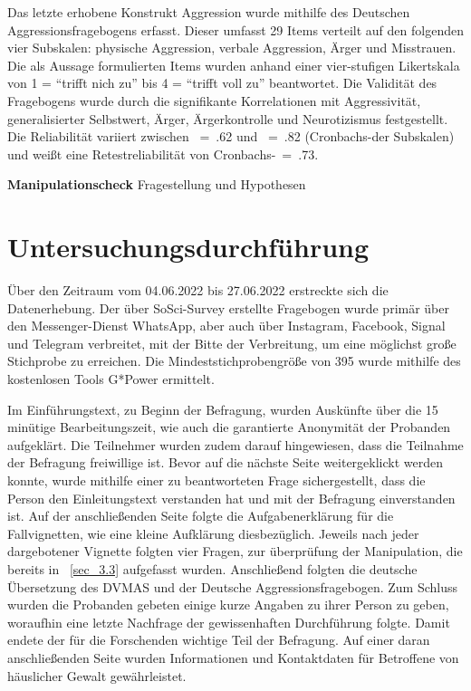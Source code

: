 Das letzte erhobene Konstrukt Aggression wurde mithilfe des Deutschen Aggressionsfragebogens erfasst. Dieser umfasst 29 Items verteilt auf den folgenden vier Subskalen: physische Aggression, verbale Aggression, Ärger und Misstrauen. Die als Aussage formulierten Items wurden anhand einer vier-stufigen Likertskala von 1 = \enquote{trifft nich zu} bis 4 = \enquote{trifft voll zu} beantwortet. Die Validität des Fragebogens wurde durch die signifikante Korrelationen mit Aggressivität, generalisierter Selbstwert, Ärger, Ärgerkontrolle und Neurotizismus festgestellt. Die Reliabilität variiert zwischen \textalpha~=~.62 und \textalpha~=~.82 (Cronbachs-\textalpha der Subskalen) und weißt eine Retestreliabilität von Cronbachs-\textalpha~=~.73\parencite{Aggressionsfragebogen}.

\textbf{Manipulationscheck}
Fragestellung und Hypothesen


\section{Untersuchungsdurchführung}   \label{sec_3.4}
Über den Zeitraum vom 04.06.2022 bis 27.06.2022 erstreckte sich die Datenerhebung. Der über SoSci-Survey erstellte Fragebogen wurde primär über den Messenger-Dienst WhatsApp, aber auch über Instagram, Facebook, Signal und Telegram verbreitet, mit der Bitte der Verbreitung, um eine möglichst große Stichprobe zu erreichen. Die Mindeststichprobengröße von 395 wurde mithilfe des kostenlosen Tools G*Power ermittelt. %

Im Einführungstext, zu Beginn der Befragung, wurden Auskünfte über die 15 minütige Bearbeitungszeit, wie auch die garantierte Anonymität der Probanden aufgeklärt. Die Teilnehmer wurden zudem darauf hingewiesen, dass die Teilnahme der Befragung freiwillige ist. Bevor auf die nächste Seite weitergeklickt werden konnte, wurde mithilfe einer zu beantworteten Frage sichergestellt, dass die Person den Einleitungstext verstanden hat und mit der Befragung einverstanden ist. Auf der anschließenden Seite folgte die Aufgabenerklärung für die Fallvignetten, wie eine kleine Aufklärung diesbezüglich. Jeweils nach jeder dargebotener Vignette folgten vier Fragen, zur überprüfung der Manipulation, die bereits in ~\ref{sec_3.3} aufgefasst wurden. Anschließend folgten die deutsche Übersetzung des DVMAS und der Deutsche Aggressionsfragebogen. Zum Schluss wurden die Probanden gebeten einige kurze Angaben zu ihrer Person zu geben, woraufhin eine letzte Nachfrage der gewissenhaften Durchführung folgte. Damit endete der für die Forschenden wichtige Teil der Befragung. Auf einer daran anschließenden Seite wurden Informationen und Kontaktdaten für Betroffene von häuslicher Gewalt gewährleistet. 

